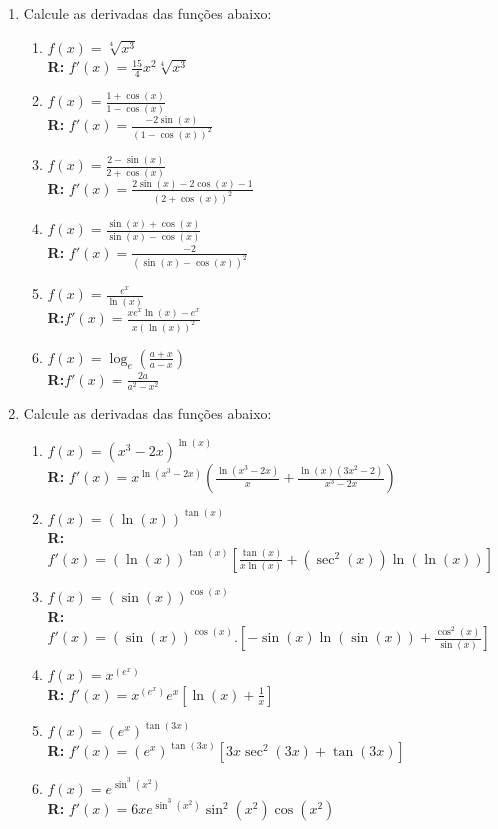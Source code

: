 \documentclass[oneside,a4paper,12pt]{article}
\begin{document}
\begin{enumerate}
	\item Calcule as derivadas das funções abaixo:
		\begin{enumerate}
			\item $f(x) = \sqrt[4]{x^3}$  \\ {\bf R:} $f'(x) = \frac{15}{4}x^2\sqrt[4]{x^3}$
			\item $f(x) = \frac{1 + \cos(x)}{1 - \cos(x)}$  \\ {\bf R:} $f'(x) = \frac{-2\sin(x)}{(1-\cos(x))^2}$
			\item $f(x) = \frac{2 - \sin(x)}{2 + \cos(x)}$  \\ {\bf R:} $f'(x) = \frac{2\sin(x) - 2\cos(x)-1}{(2+\cos(x))^2}$
			\item $f(x) = \frac{\sin(x) + \cos(x)}{\sin(x) - \cos(x)}$  \\ {\bf R:} $f'(x) = \frac{-2}{(\sin(x) - \cos(x))^2}$
			\item $f(x) = \frac{e^x}{\ln(x)}$  \\ {\bf R:}$f'(x) = \frac{xe^x\ln(x)-e^x}{x(\ln(x))^2}$
			\item $f(x) = \log_{e}(\frac{a+x}{a-x})$ \\ {\bf R:}$f'(x) = \frac{2a}{a^2 - x^2}$
		\end{enumerate}
	
	\item Calcule as derivadas das funções abaixo:
		\begin{enumerate}
			\item $f(x) = (x^3 - 2x)^{\ln(x)}$ \\ {\bf R:} $f'(x) = x^{\ln \left(x^3-2x\right)}\left(\frac{\ln \left(x^3-2x\right)}{x}+\frac{\ln \left(x\right)\left(3x^2-2\right)}{x^3-2x}\right)$
			\item $f(x) = (\ln(x))^{\tan(x)}$ \\ {\bf R:} $f'(x) = (\ln(x))^{\tan(x)}\left[\frac{\tan(x)}{x\ln(x)}+ (\sec^{2}(x))\ln(\ln(x))\right]$
			\item $f(x) = (\sin(x))^{\cos(x)}$ \\ {\bf R:} $f'(x) = (\sin(x))^{\cos(x)}.\left[ -\sin(x)\ln(\sin(x))+\frac{\cos^{2}(x)}{\sin(x)} \right]$
			\item $f(x) = x^{(e^x)}$ \\ {\bf R:} $f'(x) = x^{(e^x)}e^{x}\left[ \ln(x) + \frac{1}{x} \right]$
			\item $f(x) = (e^{x})^{\tan(3x)}$ \\ {\bf R:} $f'(x) = (e^x)^{\tan(3x)}[3x\sec^2(3x)+\tan(3x)]$
			\item $f(x) = e^{\sin^{3}(x^2)}$ \\ {\bf R:} $f'(x) = 6xe^{\sin^{3}(x^2)}\sin^{2}(x^2)\cos(x^2)$
		\end{enumerate}
	

\end{enumerate}
\end{document}
